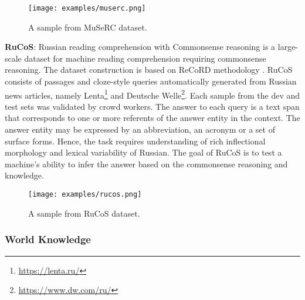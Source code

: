 \documentclass[11pt,a4paper]{article}
\begin{document}
\begin{figure}[h!]
    \centering
\texttt{[image: examples/muserc.png]}
\caption{A sample from MuSeRC dataset.}
\label{fig:sample-muserc}
\end{figure}

\textbf{RuCoS}: Russian reading comprehension with Commonsense reasoning is a large-scale dataset for machine reading comprehension requiring commonsense reasoning. The dataset construction is based on ReCoRD methodology \cite{zhang2018record}. RuCoS consists of passages and cloze-style queries automatically generated from Russian news articles, namely Lenta\footnote{\url{https://lenta.ru/}} and Deutsche Welle\footnote{\url{https://www.dw.com/ru/}}. Each sample from the dev and test sets was validated by crowd workers. The answer to each query is a text span that corresponds to one or more referents of the answer entity in the context. The answer entity may be expressed by an abbreviation, an acronym or a set of surface forms. Hence, the task requires understanding of rich inflectional morphology and lexical variability of Russian. The goal of RuCoS is to test a machine’s ability to infer the answer based on the commonsense reasoning and knowledge.

\begin{figure}[h!]
    \centering
   \texttt{[image: examples/rucos.png]}
   \caption{A sample from RuCoS dataset.}
   \label{fig:sample-rucos}
\end{figure}

\subsubsection{World Knowledge}
\end{document}
